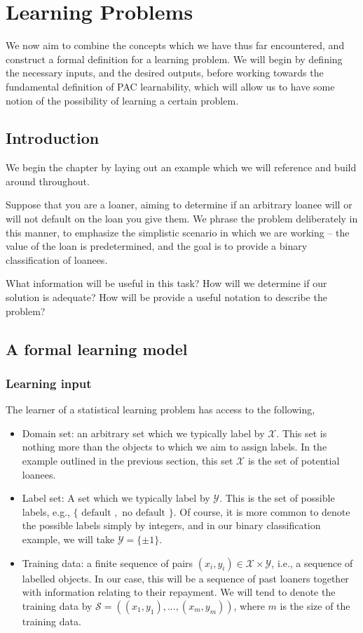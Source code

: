 \chapter{Learning Problems}

\begin{chout}
	We now aim to combine the concepts which we have thus far encountered, and construct a formal definition for a learning problem. We will begin by defining the necessary inputs, and the desired outputs, before working towards the fundamental definition of PAC learnability, which will allow us to have some notion of the possibility of learning a certain problem.
\end{chout}

\section{Introduction}
We begin the chapter by laying out an example which we will reference and build around throughout.

Suppose that you are a loaner, aiming to determine if an arbitrary loanee will or will not default on the loan you give them. We phrase the problem deliberately in this manner, to emphasize the simplistic scenario in which we are working -- the value of the loan is predetermined, and the goal is to provide a binary classification of loanees.

What information will be useful in this task? How will we determine if our solution is adequate? How will be provide a useful notation to describe the problem?

\section{A formal learning model \basic}
\subsection{Learning input}
The learner of a statistical learning problem has access to the following,
\begin{itemize}
	\item Domain set: an arbitrary set which we typically label by $ \mathcal{X} $. This set is nothing more than the objects to which we aim to assign labels. In the example outlined in the previous section, this set $ \mathcal{X} $ is the set of potential loanees.
	\item Label set: A set which we typically label by $ \mathcal{Y} $. This is the set of possible labels, e.g., $ \{ \text{ default } , \text{ no default } \} $. Of course, it is more common to denote the possible labels simply by integers, and in our binary classification example, we will take $ \mathcal{Y}=\{ \pm1 \} $.
	\item Training data: a finite sequence of pairs $ ( x_{i}, y_{i} )\in \mathcal{X}\times \mathcal{Y} $, i.e., a sequence of labelled objects. In our case, this will be a sequence of past loaners together with information relating to their repayment. We will tend to denote the training data by $ \mathcal{S} = ( ( x_{1}, y_{1} ), ..., ( x_{m}, y_{m} ) ) $, where $ m $ is the size of the training data.
\end{itemize}

